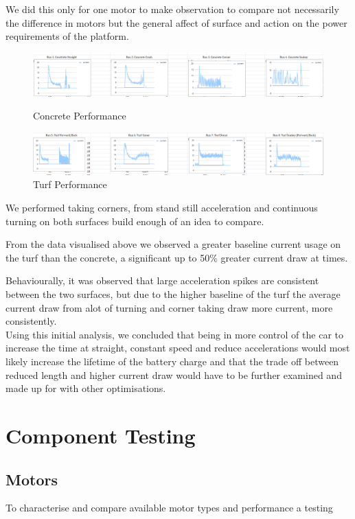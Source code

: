 \documentclass[11pt]{article}
\begin{document}
We did this only for one motor to make observation to compare not necessarily the difference in motors but the general affect of surface and action on the power requirements of the platform.

\begin{figure}[h!]
    \begin{center}
        \includegraphics[width=\textwidth]{inc/contrete_behaviour.png}
        \caption{Concrete Performance}
        \includegraphics[width=\textwidth]{inc/turf_behaviour.png}
        \caption{Turf Performance}
    \end{center}
\end{figure}

We performed taking corners, from stand still acceleration and continuous turning on both surfaces build enough of an idea to compare.

From the data visualised above we observed a greater baseline current usage on the turf than the concrete, a significant up to 50\% greater current draw at times.

Behaviourally, it was observed that large acceleration spikes are consistent between the two surfaces, but due to the higher baseline of the turf the average current draw from alot of turning and corner taking draw more current, more consistently.\\

Using this initial analysis, we concluded that being in more control of the car to increase the time at straight, constant speed and reduce accelerations would most likely increase the lifetime of the battery charge and that the trade off between reduced length and higher current draw would have to be further examined and made up for with other optimisations.



\section{Component Testing}
\subsection{Motors}
To characterise and compare available motor types and performance a testing 
\end{document}
